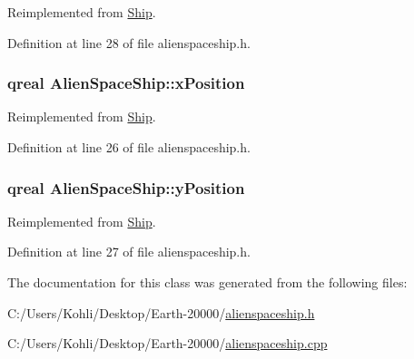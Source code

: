 Reimplemented from \hyperlink{class_ship_ae57e882cf6611414d239b241f6711ba6}{Ship}.

Definition at line 28 of file alienspaceship.h.\hypertarget{class_alien_space_ship_a4539a2e1dba8598cbc42fa262f586acd}{
\subsubsection[{xPosition}]{\setlength{\rightskip}{0pt plus 5cm}qreal {\bf AlienSpaceShip::xPosition}}}
\label{class_alien_space_ship_a4539a2e1dba8598cbc42fa262f586acd}


Reimplemented from \hyperlink{class_ship_a6ccec9a60696c66ede61af7397c73b3c}{Ship}.

Definition at line 26 of file alienspaceship.h.\hypertarget{class_alien_space_ship_acb7a7bbfb71e3673768212f9239ea3b3}{
\subsubsection[{yPosition}]{\setlength{\rightskip}{0pt plus 5cm}qreal {\bf AlienSpaceShip::yPosition}}}
\label{class_alien_space_ship_acb7a7bbfb71e3673768212f9239ea3b3}


Reimplemented from \hyperlink{class_ship_a5964ed05737d3b6722c7af5e0f173475}{Ship}.

Definition at line 27 of file alienspaceship.h.

The documentation for this class was generated from the following files:\begin{DoxyCompactItemize}
\item 
C:/Users/Kohli/Desktop/Earth-\/20000/\hyperlink{alienspaceship_8h}{alienspaceship.h}\item 
C:/Users/Kohli/Desktop/Earth-\/20000/\hyperlink{alienspaceship_8cpp}{alienspaceship.cpp}\end{DoxyCompactItemize}

